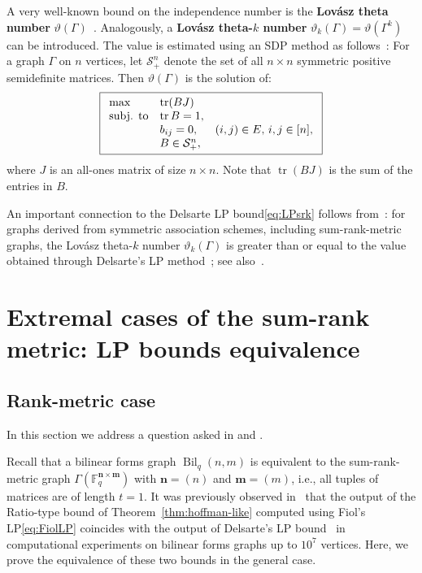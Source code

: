 \documentclass[a4paper]{article}
\newcommand{\F}{\mathbb{F}}
\newcommand{\Bil}{\operatorname{Bil}}
\newcommand{\bfn}{\mathbf {n}}
\newcommand{\bfm}{\mathbf {m}}
\begin{document}
A very well-known bound on the independence number is the \textbf{Lov\'asz theta number} $\vartheta(\Gamma)$~\cite{Lovasz}. Analogously, a \textbf{Lov\'asz theta-$k$ number} $\vartheta_k(\Gamma)=\vartheta(\Gamma^k)$ can be introduced. The value is estimated using an SDP method as follows~\cite{Lovasz}: 
For a graph $\Gamma$ on $n$ vertices, let $\mathcal{S}_+^n$ denote the set of all $n\times n$ symmetric positive semidefinite matrices. Then $\vartheta(\Gamma)$ is the solution of:
\begin{equation}\label{eq:LovaszSDP}
\boxed{
\begin{array}{ll@{}l}
\text{max}  &\operatorname{tr}(BJ) &\\
\text{subj. to} &\operatorname{tr}B=1, &\\
&b_{ij}=0, &\quad (i,j)\in E,\,i,j\in[n],\\
&B\in\mathcal{S}_+^n, &\\ 
\end{array}
}
\end{equation}
where $J$ is an all-ones matrix of size $n\times n$. Note that $\operatorname{tr}(BJ)$ is the sum of the entries in $B$.

An important connection to the Delsarte LP bound\:\eqref{eq:LPsrk} follows from~\cite{S79}: for graphs derived from symmetric association schemes, including sum-rank-metric graphs, the Lov\'asz theta-$k$ number $\vartheta_k(\Gamma)$ is greater than or equal to the value obtained through Delsarte's LP method~\cite{DelsarteLP}; see also~\cite[Remark~4.1]{AGKP2024}.

\section{Extremal cases of the sum-rank metric: LP bounds equivalence}\label{sec:equivalencesLPbounds}

\subsection{Rank-metric case}

In this section we address a question asked in \cite{AAR2025} and \cite{AGKP2024}.

Recall that a bilinear forms graph $\Bil_q(n,m)$ is equivalent to the sum-rank-metric graph $\Gamma(\F_q^{\bfn\times\bfm})$ with $\bfn=(n)$ and $\bfm=(m)$, i.e., all tuples of matrices are of length $t=1$. It was previously observed in~\cite{AGKP2024} that the output of the Ratio-type bound of Theorem~\ref{thm:hoffman-like} computed using Fiol's LP\:\eqref{eq:FiolLP} coincides with the output of Delsarte's LP bound~\cite{DelsarteLP,D1978} in computational experiments on bilinear forms graphs up to $10^7$ vertices. Here, we prove the equivalence of these two bounds in the general case.
\end{document}
